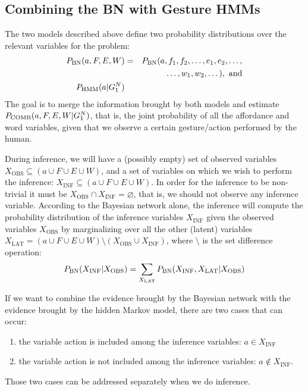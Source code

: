 
\newcommand{\pcomb}{\ensuremath P_{\text{COMB}}}

\subsection{Combining the \acs{BN} with Gesture \acsp{HMM}}
\label{sec:combination}
The two models described above define two probability distributions over the relevant variables for the problem:
\begin{eqnarray*}
  P_{\text{BN}}(a, F, E, W) &=& P_{\text{BN}}(a, f_1, f_2, \dots, e_1, e_2, \dots,\\
  && \hspace{1cm} \dots, w_1, w_2, \dots), \text{ and} \\
  P_{\text{HMM}}(a|G_1^N) &&
\end{eqnarray*}
The goal is to merge the information brought by both models and estimate $\pcomb(a, F, E, W|G_1^N)$, that is, the joint probability of all the affordance and word variables, given that we observe a certain gesture/action performed by the human.

During inference, we will have a (possibly empty) set of observed variables $X_\text{OBS} \subseteq (a \cup F \cup E \cup W)$, and a set of variables on which we wish to perform the inference: $X_\text{INF} \subseteq (a \cup F \cup E \cup W)$.
In order for the inference to be non-trivial it must be $X_\text{OBS} \cap X_\text{INF} = \varnothing$, that is, we should not observe any inference variable.
According to the Bayesian network alone, the inference will compute the probability distribution of the inference variables $X_\text{INF}$ given the observed variables $X_\text{OBS}$ by marginalizing over all the other (latent) variables $X_\text{LAT} = (a \cup F \cup E \cup W) \setminus (X_\text{OBS} \cup X_\text{INF})$, where $\setminus$ is the set difference operation:
\begin{eqnarray*}
 P_{\text{BN}}(X_\text{INF}|X_\text{OBS}) = \sum_{X_\text{LAT}} P_{\text{BN}}(X_\text{INF}, X_\text{LAT}| X_\text{OBS})
\end{eqnarray*}

If we want to combine the evidence brought by the Bayesian network with the evidence brought by the hidden Markov model, there are two cases that can occur:
\begin{enumerate}
\item the variable action is included among the inference variables: $a \in X_\text{INF}$
\item the variable action is not included among the inference variables: $a \not\in X_\text{INF}$.
\end{enumerate}
Those two cases can be addressed separately when we do inference.

